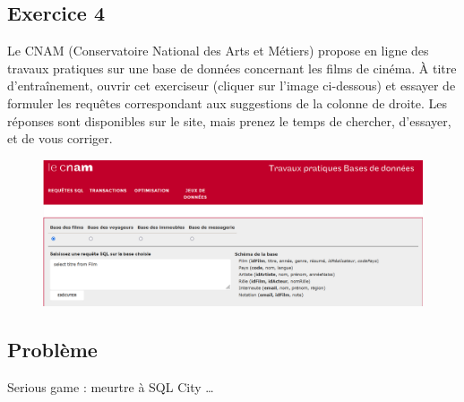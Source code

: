 \documentclass[
  letterpaper,
  DIV=11,
  numbers=noendperiod]{scrartcl}
\begin{document}
\hypertarget{fa-desktop-exercice-4}{%
\subsection{\texorpdfstring{ Exercice
4}{ Exercice 4}}\label{fa-desktop-exercice-4}}

Le CNAM (Conservatoire National des Arts et Métiers) propose en ligne
des travaux pratiques sur une base de données concernant les films de
cinéma. À titre d'entraînement, ouvrir cet exerciseur (cliquer sur
l'image ci-dessous) et essayer de formuler les requêtes correspondant
aux suggestions de la colonne de droite. Les réponses sont disponibles
sur le site, mais prenez le temps de chercher, d'essayer, et de vous
corriger.

\begin{figure}

{\centering 

\href{https://deptfod.cnam.fr/bd/tp/}{\includegraphics{CNAM_SQL.png}}

}

\end{figure}

\hypertarget{fa-desktop-probluxe8me}{%
\subsection{\texorpdfstring{
Problème}{ Problème}}\label{fa-desktop-probluxe8me}}

Serious game : meurtre à SQL City \ldots{}
\end{document}
